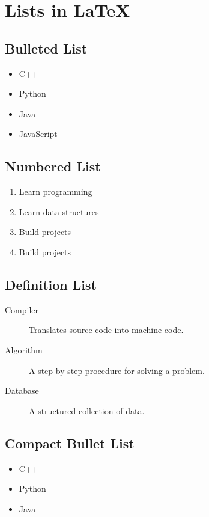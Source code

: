 \documentclass{article}
\begin{document}
\section*{Lists in LaTeX}

\subsection*{Bulleted List}

\begin{itemize}
    \item C++
    \item Python
    \item Java
    \item JavaScript
\end{itemize}


\subsection*{Numbered List}

\begin{enumerate}
    \item Learn programming
    \item Learn data structures
    \item Build projects
    \item Build projects
\end{enumerate}


\subsection*{Definition List}

\begin{description}
    \item[Compiler] Translates source code into machine code.
    \item[Algorithm] A step-by-step procedure for solving a problem.
    \item[Database] A structured collection of data.
\end{description}


\subsection*{Compact Bullet List}

\begin{itemize}[noitemsep]
    \item C++
    \item Python
    \item Java
\end{itemize}
\end{document}
